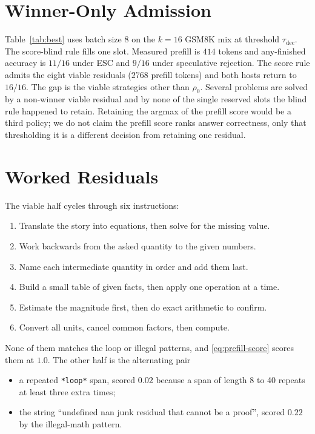 \section{Winner-Only Admission}
\label{app:best}

Table~\ref{tab:best} uses batch size $8$ on the $k{=}16$ GSM8K mix at threshold $\tau_{\mathrm{dec}}$.
The score-blind rule fills one slot.
Measured prefill is $414$ tokens and any-finished accuracy is $11/16$ under ESC and $9/16$ under speculative rejection.
The score rule admits the eight viable residuals ($2768$ prefill tokens) and both hosts return to $16/16$.
The gap is the viable strategies other than $\rho_0$.
Several problems are solved by a non-winner viable residual and by none of the single reserved slots the blind rule happened to retain.
Retaining the argmax of the prefill score would be a third policy; we do not claim the prefill score ranks answer correctness, only that thresholding it is a different decision from retaining one residual.

\section{Worked Residuals}
\label{app:examples}

The viable half cycles through six instructions:

\begin{enumerate}
  \item Translate the story into equations, then solve for the missing value.
  \item Work backwards from the asked quantity to the given numbers.
  \item Name each intermediate quantity in order and add them last.
  \item Build a small table of given facts, then apply one operation at a time.
  \item Estimate the magnitude first, then do exact arithmetic to confirm.
  \item Convert all units, cancel common factors, then compute.
\end{enumerate}

None of them matches the loop or illegal patterns, and \eqref{eq:prefill-score} scores them at $1.0$.
The other half is the alternating pair

\begin{itemize}
  \item a repeated \texttt{*loop*} span, scored $0.02$ because a span of length 8 to 40 repeats at least three extra times;
  \item the string ``undefined nan junk residual that cannot be a proof'', scored $0.22$ by the illegal-math pattern.
\end{itemize}

